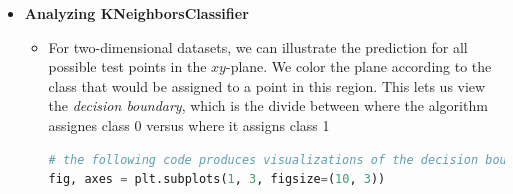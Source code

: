 \documentclass{article}
\begin{document}
\begin{itemize}
\begin{itemize}
\begin{lstlisting}[language = Python]
X_train, X_test, y_train, y_test = train_test_split(X, y, random_state = 0)
\end{lstlisting}
\begin{lstlisting}[language = Python]
# Fit the classifier using the training set
clf.fit(X_train, y_train)
\end{lstlisting}
\begin{lstlisting}[language = Python]
# To make predictions on the test data, we call the predict method. For each data point in the test set, this computes its nearest neighbors in the training set and finds the most common class among these
print("Test set predictions: {}".format(clf.predict(X_test)))
\end{lstlisting}
\begin{lstlisting}[language = Python]
# To evaluate how well the model generalizes, call the score method with the test data together with the test labels
print("Test set accuracy: {:.2f}".format(clf.score(X_test,y_test)))
\end{lstlisting}
    \end{itemize}
    \item \textbf{Analyzing KNeighborsClassifier}
    \begin{itemize}
        \item For two-dimensional datasets, we can illustrate the prediction for all possible test points in the $xy$-plane. We color the plane according to the class that would be assigned to a point in this region. This lets us view the \emph{decision boundary}, which is the divide between where the algorithm assignes class 0 versus where it assigns class 1
\begin{lstlisting}[language = Python]
# the following code produces visualizations of the decision boundaries for one, three, and nine neighbors
fig, axes = plt.subplots(1, 3, figsize=(10, 3))


\end{lstlisting}
\end{itemize}
\end{itemize}
\end{document}
